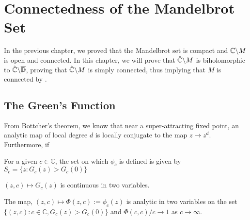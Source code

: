 \chapter{Connectedness of the Mandelbrot Set}
In the previous chapter, we proved that the Mandelbrot set is compact and \( \mathbb{C}\backslash M \)
is open and connected. In this chapter, we will prove that \( \hat{\mathbb{C}}\backslash M \) is biholomorphic
to \( \hat{\mathbb{C}}\backslash \overline{\mathbb{D}}  \), proving that \( \hat{\mathbb{C}}\backslash M \) is simply connected, thus implying that \( M \) is connected by .

\section{The Green's Function}
From Bottcher's theorem, we know that near a super-attracting fixed point, an analytic map of local degree \( d \) 
is locally conjugate to the map \( z\mapsto z^d \). Furthermore, if 

\begin{theorem}
	For a given \( c\in \mathbb{C} \), the set on which \( \phi_c \) is defined is given by \( S_c=\{z:G_c(z)>G_c(0)\} \)
\end{theorem}

\begin{theorem}
	\( (z,c)\mapsto G_c(z) \) is continuous in two variables.
\end{theorem}

\begin{theorem}
	The map, \( (z,c)\mapsto \Phi(z,c):= \phi_c(z) \) is analytic in two variables on the set \( \{(z,c):c\in \mathbb{C},G_c(z)>G_c(0)\} \) and \( \Phi(c,c) /c\to 1 \) as \( c\to \infty \).
\end{theorem}

